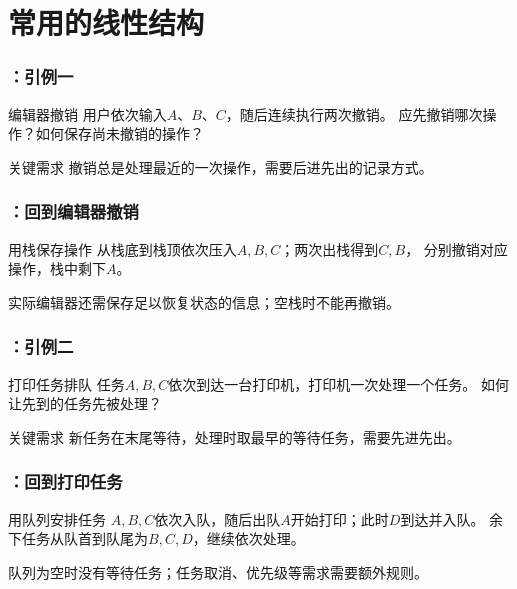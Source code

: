 \section{常用的线性结构}

\begin{frame}
    \frametitle{\insertsectionhead：引例一}
    \begin{exampleblock}{编辑器撤销}
        用户依次输入$A$、$B$、$C$，随后连续执行两次撤销。
        应先撤销哪次操作？如何保存尚未撤销的操作？
    \end{exampleblock}
    \begin{block}{关键需求}
        撤销总是处理最近的一次操作，需要后进先出的记录方式。
    \end{block}
\end{frame}



\begin{frame}
    \frametitle{\insertsectionhead：回到编辑器撤销}
    \begin{exampleblock}{用栈保存操作}
        从栈底到栈顶依次压入$A,B,C$；两次出栈得到$C,B$，
        分别撤销对应操作，栈中剩下$A$。
    \end{exampleblock}
    实际编辑器还需保存足以恢复状态的信息；空栈时不能再撤销。
\end{frame}

\begin{frame}
    \frametitle{\insertsectionhead：引例二}
    \begin{exampleblock}{打印任务排队}
        任务$A,B,C$依次到达一台打印机，打印机一次处理一个任务。
        如何让先到的任务先被处理？
    \end{exampleblock}
    \begin{block}{关键需求}
        新任务在末尾等待，处理时取最早的等待任务，需要先进先出。
    \end{block}
\end{frame}



\begin{frame}
    \frametitle{\insertsectionhead：回到打印任务}
    \begin{exampleblock}{用队列安排任务}
        $A,B,C$依次入队，随后出队$A$开始打印；此时$D$到达并入队。
        余下任务从队首到队尾为$B,C,D$，继续依次处理。
    \end{exampleblock}
    队列为空时没有等待任务；任务取消、优先级等需求需要额外规则。
\end{frame}

